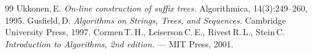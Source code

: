 \begin{thebibliography}{99}
Ukkonen,\,E.
{\itshape On-line construction of suffix trees.}
Algorithmica, 14(3):249--260, 1995.
Gusfield,\,D.
{\itshape Algorithms on Strings, Trees, and Sequences.}
Cambridge University Press, 1997.
Cormen\,T.\,H., Leiserson\,C.\,E., Rivest\,R.\,L., Stein\,C.
{\itshape Introduction to Algorithms, 2nd edition.} --- MIT Press, 2001.
\end{thebibliography}
\pagebreak
